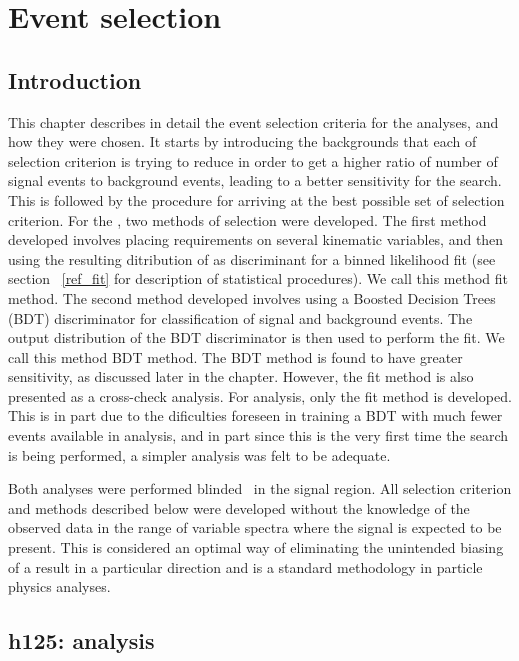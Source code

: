 \chapter{Event selection}
\label{evt_sel}
\section{Introduction}
\label{evt_sel_intro}
This chapter describes in detail the event selection criteria for the analyses, and how they were chosen. It starts by introducing the backgrounds that each of selection criterion is trying to reduce in order to get a higher ratio of number of signal events to background events, leading to a better sensitivity for the search. This is followed by the procedure for arriving at the best possible set of selection criterion. For the \hmue, two methods of selection were developed. The first method developed involves placing requirements on several kinematic variables, and then using the resulting ditribution of \mcol as discriminant for a binned likelihood fit (see section ~\ref{ref_fit} for description of statistical procedures). We call this method \mcol fit method. The second method developed involves using a Boosted Decision Trees (BDT) discriminator  for classification of signal and background events. The output distribution of the BDT discriminator is then used to perform the fit. We call this method BDT method. The BDT method is found to have greater sensitivity, as discussed later in the chapter. However, the \mcol fit method is also presented as a cross-check analysis. For \Hmue analysis, only the \mcol fit method is developed. This is in part due to the dificulties foreseen in training a BDT with much fewer events available in \Hmue analysis, and in part since this is the very first time the \Hmue search is being performed, a simpler analysis was felt to be adequate.  

Both analyses were performed blinded~\cite{blind_analysis} in the signal region. All selection criterion and methods described below were developed without the knowledge of the observed data in the range of variable spectra where the signal is expected to be present. This is considered an optimal way of eliminating the unintended biasing of a result in a particular direction and is a standard methodology in particle physics analyses.

\section{h125: \hmue analysis}
